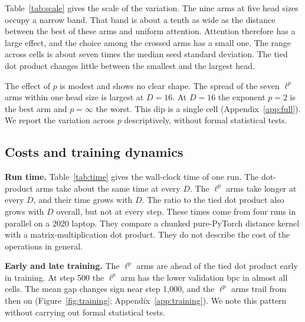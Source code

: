 \documentclass[11pt]{article}
\begin{document}
Table~\ref{tab:scale} gives the scale of the variation.
The nine arms at five head sizes occupy a narrow band.
That band is about a tenth as wide as the distance between the best of these arms and uniform attention.
Attention therefore has a large effect, and the choice among the crossed arms has a small one.
The range across cells is about seven times the median seed standard deviation.
The tied dot product changes little between the smallest and the largest head.

The effect of $p$ is modest and shows no clear shape.
The spread of the seven $\ell^p$ arms within one head size is largest at $D=16$.
At $D=16$ the exponent $p=2$ is the best arm and $p=\infty$ the worst.
This dip is a single cell (Appendix~\ref{app:full}).
We report the variation across $p$ descriptively, without formal statistical tests.

\subsection{Costs and training dynamics}\label{sec:cost}

\textbf{Run time.}
Table~\ref{tab:time} gives the wall-clock time of one run.
The dot-product arms take about the same time at every $D$.
The $\ell^p$ arms take longer at every $D$, and their time grows with $D$.
The ratio to the tied dot product also grows with $D$ overall, but not at every step.
These times come from four runs in parallel on a 2020 laptop.
They compare a chunked pure-PyTorch distance kernel \citep{paszke2019} with a matrix-multiplication dot product.
They do not describe the cost of the operations in general.

\begin{table}[t]
\centering\small

\caption{Mean wall-clock minutes per run (4,000 steps, five seeds), by arm and head size, and the ratio of the fastest and slowest $\ell^p$ arm to the tied dot product. Four runs in parallel, one thread each, on a 2020 Intel laptop.}
\label{tab:time}
\end{table}

\textbf{Early and late training.}
The $\ell^p$ arms are ahead of the tied dot product early in training.
At step 500 the $\ell^p$ arm has the lower validation bpc in almost all cells.
The mean gap changes sign near step 1,000, and the $\ell^p$ arms trail from then on (Figure~\ref{fig:training}; Appendix~\ref{app:training}).
We note this pattern without carrying out formal statistical tests.
\end{document}

